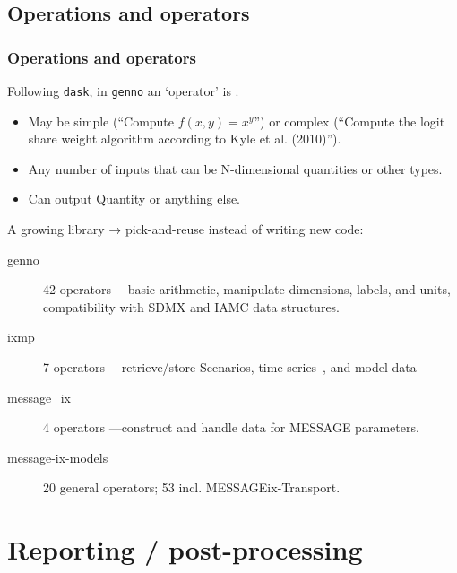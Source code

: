 \documentclass[12pt,aspectratio=169]{beamer}
\renewcommand{\mod}[1]{\texttt{#1}}
\begin{document}
\subsection{Operations and operators}

\begin{frame}
\frametitle{Operations and operators}

Following \mod{dask}, in \mod{genno} an ‘operator’ is .
\begin{itemize}
  \item May be simple (“Compute $f(x,y) = x^y$”) or complex (“Compute the logit share weight algorithm according to Kyle et al. (2010)”).
  \item Any number of inputs that can be N-dimensional quantities or other types.
  \item Can output Quantity or anything else.
\end{itemize}

\medskip
A growing library → pick-and-reuse instead of writing new code:
\begin{description}
  \item [\ttfamily genno] 42 operators%
    —basic arithmetic,
    manipulate dimensions, labels, and units,
    compatibility with SDMX and IAMC data structures.
  \item [\ttfamily ixmp] 7 operators%
    —retrieve/store Scenarios, time-series–, and model data
  \item [\ttfamily message\_ix] 4 operators%
    —construct and handle data for MESSAGE parameters.
  \item [\ttfamily message-ix-models] 20 general operators; 53 incl. MESSAGEix-Transport.
\end{description}
\end{frame}

\section{Reporting / post-processing}
\end{document}
